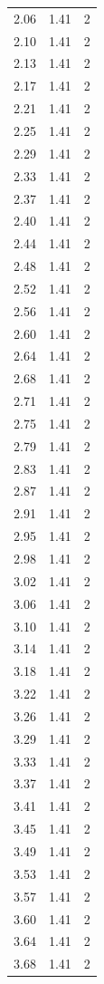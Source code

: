\begin{longtable}{lrr}
  2.06 & 1.41 & 2 \\
  2.10 & 1.41 & 2 \\
  2.13 & 1.41 & 2 \\
  2.17 & 1.41 & 2 \\
  2.21 & 1.41 & 2 \\
  2.25 & 1.41 & 2 \\
  2.29 & 1.41 & 2 \\
  2.33 & 1.41 & 2 \\
  2.37 & 1.41 & 2 \\
  2.40 & 1.41 & 2 \\
  2.44 & 1.41 & 2 \\
  2.48 & 1.41 & 2 \\
  2.52 & 1.41 & 2 \\
  2.56 & 1.41 & 2 \\
  2.60 & 1.41 & 2 \\
  2.64 & 1.41 & 2 \\
  2.68 & 1.41 & 2 \\
  2.71 & 1.41 & 2 \\
  2.75 & 1.41 & 2 \\
  2.79 & 1.41 & 2 \\
  2.83 & 1.41 & 2 \\
  2.87 & 1.41 & 2 \\
  2.91 & 1.41 & 2 \\
  2.95 & 1.41 & 2 \\
  2.98 & 1.41 & 2 \\
  3.02 & 1.41 & 2 \\
  3.06 & 1.41 & 2 \\
  3.10 & 1.41 & 2 \\
  3.14 & 1.41 & 2 \\
  3.18 & 1.41 & 2 \\
  3.22 & 1.41 & 2 \\
  3.26 & 1.41 & 2 \\
  3.29 & 1.41 & 2 \\
  3.33 & 1.41 & 2 \\
  3.37 & 1.41 & 2 \\
  3.41 & 1.41 & 2 \\
  3.45 & 1.41 & 2 \\
  3.49 & 1.41 & 2 \\
  3.53 & 1.41 & 2 \\
  3.57 & 1.41 & 2 \\
  3.60 & 1.41 & 2 \\
  3.64 & 1.41 & 2 \\
  3.68 & 1.41 & 2 \\

\end{longtable}
